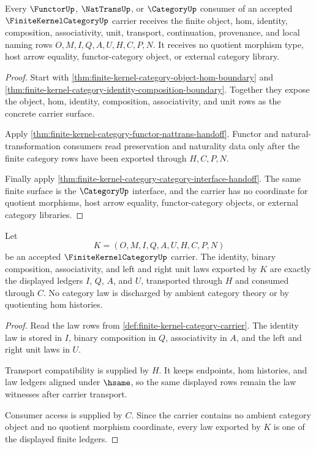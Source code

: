 \begin{theorem}
\label{thm:finite-kernel-category-ledger-nonescape-boundary}
Every $\FunctorUp$, $\NatTransUp$, or $\CategoryUp$ consumer of an accepted $\FiniteKernelCategoryUp$ carrier receives the finite object, hom, identity, composition, associativity, unit, transport, continuation, provenance, and local naming rows $O,M,I,Q,A,U,H,C,P,N$. It receives no quotient morphism type, host arrow equality, functor-category object, or external category library.
\end{theorem}
\begin{proof}
Start with \autoref{thm:finite-kernel-category-object-hom-boundary} and \autoref{thm:finite-kernel-category-identity-composition-boundary}. Together they expose the object, hom, identity, composition, associativity, and unit rows as the concrete carrier surface.

Apply \autoref{thm:finite-kernel-category-functor-nattrans-handoff}. Functor and natural-transformation consumers read preservation and naturality data only after the finite category rows have been exported through $H,C,P,N$.

Finally apply \autoref{thm:finite-kernel-category-category-interface-handoff}. The same finite surface is the $\CategoryUp$ interface, and the carrier has no coordinate for quotient morphisms, host arrow equality, functor-category objects, or external category libraries.
\end{proof}

\begin{theorem}
\label{thm:finite-kernel-category-composition-laws}
Let
$$
K=(O,M,I,Q,A,U,H,C,P,N)
$$
be an accepted $\FiniteKernelCategoryUp$ carrier. The identity, binary composition, associativity, and left and right unit laws exported by $K$ are exactly the displayed ledgers $I$, $Q$, $A$, and $U$, transported through $H$ and consumed through $C$. No category law is discharged by ambient category theory or by quotienting hom histories.
\end{theorem}
\begin{proof}
Read the law rows from \autoref{def:finite-kernel-category-carrier}. The identity law is stored in $I$, binary composition in $Q$, associativity in $A$, and the left and right unit laws in $U$.

Transport compatibility is supplied by $H$. It keeps endpoints, hom histories, and law ledgers aligned under $\hsame$, so the same displayed rows remain the law witnesses after carrier transport.

Consumer access is supplied by $C$. Since the carrier contains no ambient category object and no quotient morphism coordinate, every law exported by $K$ is one of the displayed finite ledgers.
\end{proof}

